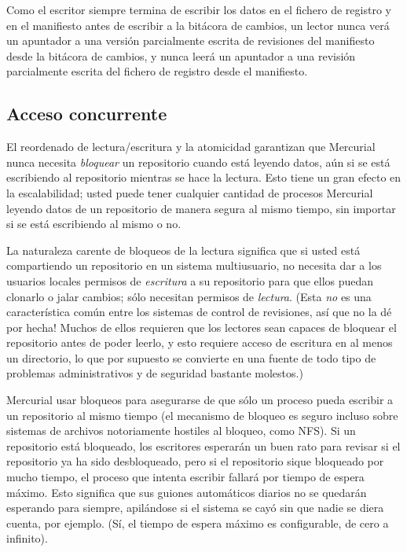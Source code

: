 Como el escritor siempre termina de escribir los datos en el fichero
de registro y en el manifiesto antes de escribir a la bitácora de
cambios, un lector nunca verá un apuntador a una versión parcialmente
escrita de revisiones del manifiesto desde la bitácora de cambios, y
nunca leerá un apuntador a una revisión parcialmente escrita del
fichero de registro desde el manifiesto.

\subsection{Acceso concurrente}

El reordenado de lectura/escritura y la atomicidad garantizan que
Mercurial nunca necesita \emph{bloquear} un repositorio cuando está
leyendo datos, aún si se está escribiendo al repositorio mientras se
hace la lectura. Esto tiene un gran efecto en la escalabilidad; usted
puede tener cualquier cantidad de procesos Mercurial leyendo datos de
un repositorio de manera segura al mismo tiempo, sin importar si se
está escribiendo al mismo o no.

La naturaleza carente de bloqueos de la lectura significa que si usted
está compartiendo un repositorio en un sistema multiusuario, no
necesita dar a los usuarios locales permisos de \emph{escritura} a su
repositorio para que ellos puedan clonarlo o jalar cambios; sólo
necesitan permisos de \emph{lectura}. (Esta \emph{no} es una
característica común entre los sistemas de control de revisiones, así
que no la dé por hecha! Muchos de ellos requieren que los lectores
sean capaces de bloquear el repositorio antes de poder leerlo, y esto
requiere acceso de escritura en al menos un directorio, lo que por
supuesto se convierte en una fuente de todo tipo de problemas
administrativos y de seguridad bastante molestos.)

Mercurial usar bloqueos para asegurarse de que sólo un proceso pueda
escribir a un repositorio al mismo tiempo (el mecanismo de bloqueo es
seguro incluso sobre sistemas de archivos notoriamente hostiles al
bloqueo, como NFS). Si un repositorio está bloqueado, los escritores
esperarán un buen rato para revisar si el repositorio ya ha sido
desbloqueado, pero si el repositorio sique bloqueado por mucho tiempo,
el proceso que intenta escribir fallará por tiempo de espera máximo.
Esto significa que sus guiones automáticos diarios no se quedarán
esperando para siempre, apilándose si el sistema se cayó sin que nadie
se diera cuenta, por ejemplo. (Sí, el tiempo de espera máximo es
configurable, de cero a infinito).


